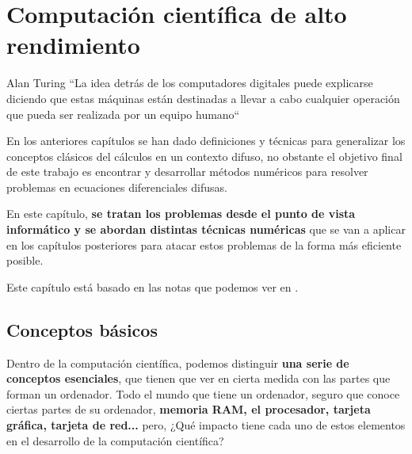 
\chapter{Computación científica de alto rendimiento}
\begin{chapquote}{Alan Turing}
	``La idea detrás de los computadores digitales puede explicarse diciendo que estas máquinas están destinadas a llevar a cabo cualquier operación que pueda ser realizada por un equipo humano``
\end{chapquote}
En los anteriores capítulos se han dado definiciones y técnicas para generalizar los conceptos clásicos del cálculos en un contexto difuso, no obstante el objetivo final de este trabajo es encontrar y desarrollar métodos numéricos para resolver problemas en ecuaciones diferenciales difusas.

En este capítulo, \textbf{se tratan los problemas desde el punto de vista informático y se abordan distintas técnicas numéricas} que se van a aplicar en los capítulos posteriores para atacar estos problemas de la forma más eficiente posible. 

Este capítulo está basado en las notas que podemos ver en \cite{paralelo}.

\section{Conceptos básicos}
Dentro de la computación científica, podemos distinguir \textbf{una serie de conceptos esenciales}, que tienen que ver en cierta medida con las partes que forman un ordenador. Todo el mundo que tiene un ordenador, seguro que conoce ciertas partes de su ordenador, \textbf{memoria RAM, el procesador, tarjeta gráfica, tarjeta de red...} pero, ¿Qué impacto tiene cada uno de estos elementos en el desarrollo de la computación científica?

